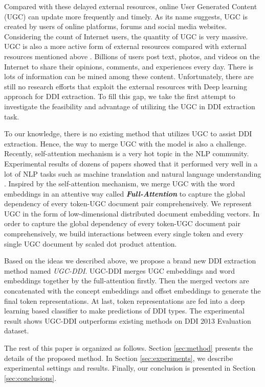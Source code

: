 \documentclass[conference]{IEEEtran}
\begin{document}
Compared with these delayed external resources, online User Generated Content (UGC) \cite{krumm_user-generated_2008}
can update more frequently and timely.
As its name suggests, UGC is created by users of online platforms, forums and social media websites.
Considering the count of Internet users, the quantity of UGC is very massive.
UGC is also a more active form of external resources compared with external resources mentioned above \cite{duan_mining_2013}.
Billions of users post text, photos, and videos on the Internet to share their opinions, comments, and experiences every day.
There is lots of information can be mined among these content.
Unfortunately, there are still no research efforts that exploit the external resources with Deep learning approach for DDI extraction. 
To fill this gap, we take the first attempt to investigate the feasibility and advantage of utilizing the UGC in DDI extraction task.

To our knowledge, there is no existing method that utilizes UGC to assist DDI extraction.
Hence, the way to merge UGC with the model is also a challenge.
Recently, self-attention mechanism is a very hot topic in the NLP community.
Experimental results of dozens of papers showed that it performed very well in a lot of NLP tasks
such as machine translation \cite{vaswani_attention_2017} and natural language understanding \cite{shen_disan:_2017}.
Inspired by the self-attention mechanism, we merge UGC with the word embeddings in an attentive way called 
\emph{\textbf{Full-Attention}} to capture the global dependency of every token-UGC document pair comprehensively.
We represent UGC in the form of low-dimensional distributed document embedding vectors.
In order to capture the global dependency of every token-UGC document pair comprehensively,
we build interactions between every single token and every single UGC document by scaled dot product attention.

Based on the ideas we described above, we propose a brand new DDI extraction method named \emph{UGC-DDI}.
UGC-DDI merges UGC embeddings and word embeddings together by the full-attention firstly.
Then the merged vectors are concatenated with the concept embeddings and offset embeddings to generate the final token representations.
At last, token representations are fed into a deep learning based classifier to make predictions of DDI types.
The experimental result shows UGC-DDI outperforms existing methods on DDI 2013 Evaluation dataset.

The rest of this paper is organized as follows.
Section \ref{sec:method} presents the details of the proposed method.
In Section \ref{sec:experiments}, we describe experimental settings and results.
Finally, our conclusion is presented in Section \ref{sec:conclusions}.
\end{document}
